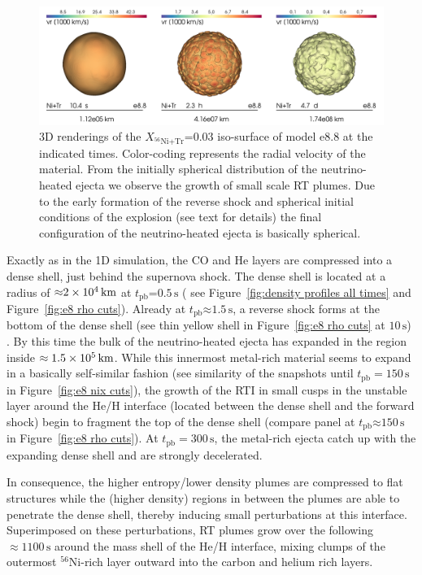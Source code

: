\documentclass[fleqn,usenatbib]{mnras}
\newcommand{\tpb}{\ensuremath{t_{\text{pb}}}}
\newcommand{\nickel}{\ensuremath{\mathrm{^{56}Ni}}\xspace}
\newcommand{\tracer}{\ensuremath{\mathrm{Tr}}\xspace}
\newcommand{\s}{\ensuremath{\text{s}}}
\newcommand{\onemg}{\ensuremath{\mathrm{e8.8}}\xspace}
\begin{document}
\begin{figure}%
\includegraphics[width=\textwidth]{pic/e8_tile_1_3.png}
    \caption{3D renderings of the $X_{\nickel\mathord{+}\tracer}\mathord{=}0.03$ 
             iso-surface of model \onemg at the indicated times. Color-coding represents the radial velocity of the material. From the initially spherical distribution of the neutrino-heated ejecta we observe the growth of small scale RT plumes. Due to the early formation of the reverse shock and spherical initial conditions of the explosion (see text for details) the final configuration of the neutrino-heated ejecta is basically spherical. }
\label{fig:e8 3d rendering}
\end{figure}%


Exactly as in the 1D simulation, the CO and He layers are compressed into a dense shell,
just behind the supernova shock. The dense shell is located at a radius of 
$\mathord{\approx}2\times 10^4\,\rm km$ at $\tpb\mathord{=}0.5\,\s$ (
see Figure~\ref{fig:density profiles all times} and Figure~\ref{fig:e8 rho cuts}).
Already at $\tpb\mathord{\approx}1.5\,\s$, a reverse shock forms at the bottom 
of the dense shell (see thin yellow shell in Figure~\ref{fig:e8 rho cuts} at $10\,\s$) .
By this time the bulk of the neutrino-heated ejecta has expanded in the region
inside $\approx 1.5\times 10^5\,\rm km$.
While this innermost metal-rich material seems to expand in a basically self-similar fashion
(see similarity of the snapshots until $\tpb=150\,\s$ in Figure~\ref{fig:e8 nix cuts}),
the growth of the RTI in small cusps in the unstable layer around the He/H interface 
(located between the dense shell and the forward shock) begin to fragment the top of 
the dense shell (compare panel at $\tpb\mathord{\approx} 150\,\s $ in Figure~\ref{fig:e8 rho cuts}). At $\tpb=300\,\s$,
the metal-rich ejecta catch up with the expanding dense shell and are strongly decelerated.

In consequence, the higher entropy/lower density plumes are compressed to flat
structures while the (higher density) regions in between the plumes are able 
to penetrate the dense shell, thereby inducing small perturbations at this interface. 
Superimposed on these perturbations, RT plumes grow over the following $\approx 1100\,\s$ 
around the mass shell of the He/H interface, mixing clumps of the outermost 
\nickel-rich layer outward into the carbon and helium rich layers.
\end{document}
